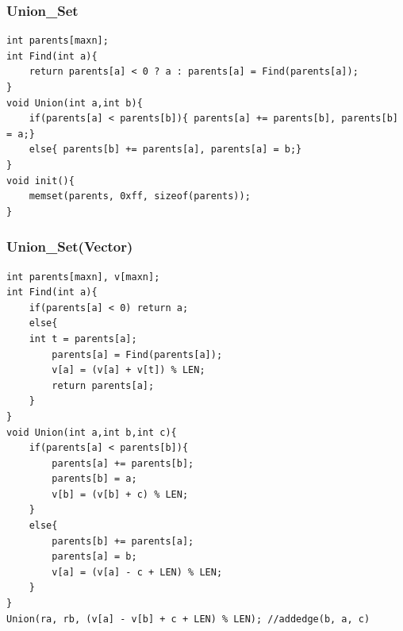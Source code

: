 \documentclass[a4paper]{article}
\begin{document}
\begin{CJK*}{UTF8}{gbsn}
\begin{multicols}{3}
\begin{flushleft}
\subsubsection{Union\_Set}
\begin{lstlisting}
int parents[maxn];
int Find(int a){
    return parents[a] < 0 ? a : parents[a] = Find(parents[a]);
}
void Union(int a,int b){
    if(parents[a] < parents[b]){ parents[a] += parents[b], parents[b] = a;}
    else{ parents[b] += parents[a], parents[a] = b;}
}
void init(){
    memset(parents, 0xff, sizeof(parents));
}
\end{lstlisting}


\subsubsection{Union\_Set(Vector)}
\begin{lstlisting}
int parents[maxn], v[maxn];
int Find(int a){
    if(parents[a] < 0) return a;
    else{
	int t = parents[a];
        parents[a] = Find(parents[a]);
        v[a] = (v[a] + v[t]) % LEN;
        return parents[a];
    }
}
void Union(int a,int b,int c){
    if(parents[a] < parents[b]){
        parents[a] += parents[b];
        parents[b] = a;
        v[b] = (v[b] + c) % LEN;
    }
    else{
        parents[b] += parents[a];
        parents[a] = b;
        v[a] = (v[a] - c + LEN) % LEN;
    }
}
Union(ra, rb, (v[a] - v[b] + c + LEN) % LEN); //addedge(b, a, c)
\end{lstlisting}



\end{flushleft}
\end{multicols}
\end{CJK*}
\end{document}
